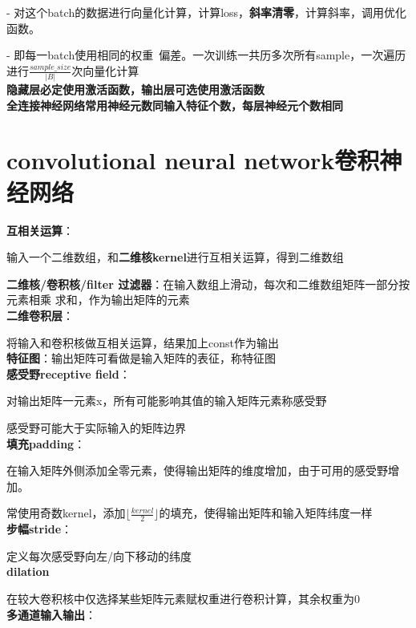 \documentclass[UTF8]{ctexart}
\begin{document}
  - 对这个batch的数据进行向量化计算，计算loss，\textbf{斜率清零}，计算斜率，调用优化函数。

  - 即每一batch使用相同的权重\ 偏差。一次训练一共历多次所有sample，一次遍历进行$\frac{sample\_size}{|B|}$次向量化计算\\
\textbf{隐藏层必定使用激活函数，输出层可选使用激活函数}\\
\textbf{全连接神经网络常用神经元数同输入特征个数，每层神经元个数相同}



\section{convolutional neural network卷积神经网络}
\noindent \textbf{互相关运算}：

  输入一个二维数组，和\textbf{二维核kernel}进行互相关运算，得到二维数组

  \textbf{二维核/卷积核/filter 过滤器}：在输入数组上滑动，每次和二维数组矩阵一部分按元素相乘 求和，作为输出矩阵的元素\\
\textbf{二维卷积层}：

  将输入和卷积核做互相关运算，结果加上const作为输出\\
\textbf{特征图}：输出矩阵可看做是输入矩阵的表征，称特征图\\
\textbf{感受野receptive field}：
  
  对输出矩阵一元素x，所有可能影响其值的输入矩阵元素称感受野

  感受野可能大于实际输入的矩阵边界\\
\textbf{填充padding}：
  
  在输入矩阵外侧添加全零元素，使得输出矩阵的维度增加，由于可用的感受野增加。

  常使用奇数kernel，添加$\lfloor \frac{kernel}{2}\rfloor $的填充，使得输出矩阵和输入矩阵纬度一样\\
\textbf{步幅stride}：

  定义每次感受野向左/向下移动的纬度\\
\textbf{dilation}

  在较大卷积核中仅选择某些矩阵元素赋权重进行卷积计算，其余权重为0\\
\textbf{多通道输入输出}：
\end{document}

